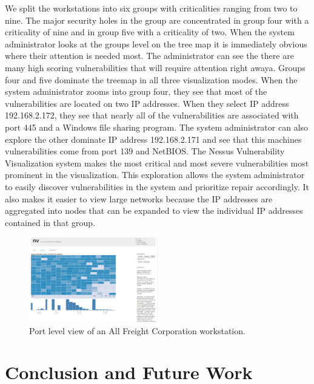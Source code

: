 \documentclass{acm_proc_article-sp}
\begin{document}
We split the workstations into six groups with criticalities ranging from two to
nine.  The major security holes in the group are concentrated in group four with a
criticality of nine and in group five with a criticality of two.  When the
system administrator looks at the groups level on the tree map it is immediately
obvious where their attention is needed most.
The administrator can see the there are many high scoring vulnerabilities that will require attention right awaya.
Groups four and five dominate the
treemap in all three visualization modes. When the system administrator zooms
into group four, they see that most of the vulnerabilities are located on two IP
addresses. When they select IP address 192.168.2.172, they see that nearly all of
the vulnerabilities are associated with port 445 and a Windows file sharing
program. The system administrator can also explore the other dominate IP address 192.168.2.171 and
see that this machines vulnerabilities come from port 139 and NetBIOS. The
Nessus Vulnerability Visualization system makes the most critical and most
severe vulnerabilities most prominent in the visualization. This
exploration allows the system administrator to easily discover vulnerabilities
in the system and prioritize repair accordingly. It also makes it easier to view large
networks because the IP addresses are aggregated into nodes that can be expanded to view
the individual IP addresses contained in that group.


\begin{figure}
  \label{VastWorkstationPort}
  \centering
  \includegraphics[width=0.5\textwidth]{../screenshots/final/VASTWorkstationPort}
  \caption{Port level view of an All Freight Corporation workstation.}
\end{figure}

\section{Conclusion and Future Work}
\end{document}
